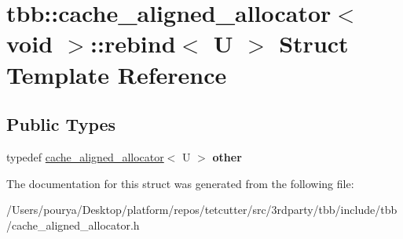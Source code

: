 \hypertarget{structtbb_1_1cache__aligned__allocator_3_01void_01_4_1_1rebind}{}\section{tbb\+:\+:cache\+\_\+aligned\+\_\+allocator$<$ void $>$\+:\+:rebind$<$ U $>$ Struct Template Reference}
\label{structtbb_1_1cache__aligned__allocator_3_01void_01_4_1_1rebind}
\subsection*{Public Types}
\begin{DoxyCompactItemize}
\item 
\hypertarget{structtbb_1_1cache__aligned__allocator_3_01void_01_4_1_1rebind_a9a8756c2c1d9425bdf7490943ae0b189}{}typedef \hyperlink{classtbb_1_1cache__aligned__allocator}{cache\+\_\+aligned\+\_\+allocator}$<$ U $>$ {\bfseries other}\label{structtbb_1_1cache__aligned__allocator_3_01void_01_4_1_1rebind_a9a8756c2c1d9425bdf7490943ae0b189}

\end{DoxyCompactItemize}


The documentation for this struct was generated from the following file\+:\begin{DoxyCompactItemize}
\item 
/\+Users/pourya/\+Desktop/platform/repos/tetcutter/src/3rdparty/tbb/include/tbb/cache\+\_\+aligned\+\_\+allocator.\+h\end{DoxyCompactItemize}
